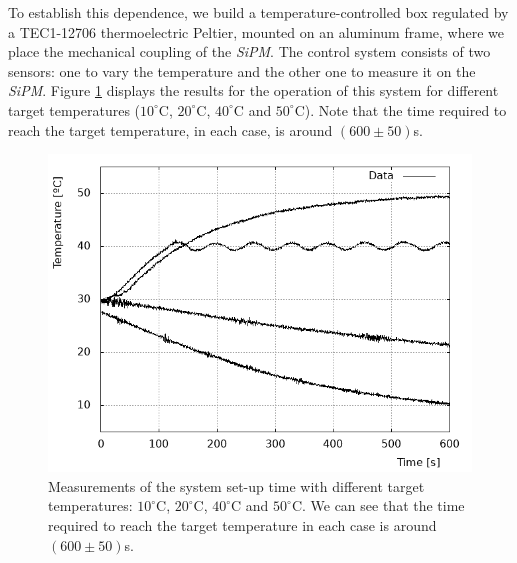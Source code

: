 \documentclass[submitting]{nst}
\begin{document}
To establish this dependence, we build a temperature-controlled box regulated by a TEC1-12706 thermoelectric Peltier, mounted on an aluminum frame, where we place the mechanical coupling of the \textsl{SiPM}.  The control system consists of two sensors: one to vary the temperature and the other one to measure it on the \textsl{SiPM}. Figure \ref{timesetup} displays the results for the operation of this system for different target temperatures ($10^{\circ}$C, $20^{\circ}$C, $40^{\circ}$C and $50^{\circ}$C).  Note that the time required to reach the target temperature, in each case, is around $(600 \pm 50)$s.
\begin{figure}[h!] 
    \centering
        \includegraphics[scale=0.48]{Figures/tiempo_establecemiento.png}
   \caption{Measurements of the system set-up time with different target temperatures: $10^{\circ}$C, $20^{\circ}$C, $40^{\circ}$C and $50^{\circ}$C. We can see that the time required to reach the target temperature in each case is around $(600 \pm 50)$s. }
   \label{timesetup}
\end{figure}
\end{document}
